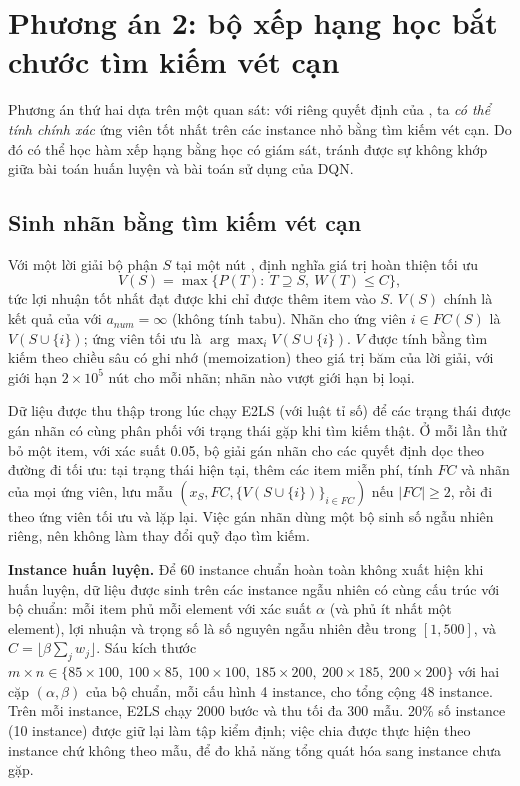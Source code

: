 \section{Phương án 2: bộ xếp hạng học bắt chước tìm kiếm vét cạn}\label{sec:ranker}

Phương án thứ hai dựa trên một quan sát: với riêng quyết định của \addstar, ta \emph{có thể tính chính xác} ứng viên tốt nhất trên các instance nhỏ bằng tìm kiếm vét cạn. Do đó có thể học hàm xếp hạng bằng học có giám sát, tránh được sự không khớp giữa bài toán huấn luyện và bài toán sử dụng của DQN.

\subsection{Sinh nhãn bằng tìm kiếm vét cạn}

Với một lời giải bộ phận $S$ tại một nút \addstar, định nghĩa giá trị hoàn thiện tối ưu
\begin{equation}
V(S)=\max\big\{P(T):\ T\supseteq S,\ W(T)\le C\big\},
\label{eq:completion}
\end{equation}
tức lợi nhuận tốt nhất đạt được khi chỉ được thêm item vào $S$. $V(S)$ chính là kết quả của \addstar với $a_{num}=\infty$ (không tính tabu). Nhãn cho ứng viên $i\in FC(S)$ là $V(S\cup\{i\})$; ứng viên tối ưu là $\arg\max_i V(S\cup\{i\})$. $V$ được tính bằng tìm kiếm theo chiều sâu có ghi nhớ (memoization) theo giá trị băm của lời giải, với giới hạn $2\times10^5$ nút cho mỗi nhãn; nhãn nào vượt giới hạn bị loại.

Dữ liệu được thu thập trong lúc chạy E2LS (với luật tỉ số) để các trạng thái được gán nhãn có cùng phân phối với trạng thái gặp khi tìm kiếm thật. Ở mỗi lần thử bỏ một item, với xác suất 0.05, bộ giải gán nhãn cho các quyết định dọc theo đường đi tối ưu: tại trạng thái hiện tại, thêm các item miễn phí, tính $FC$ và nhãn của mọi ứng viên, lưu mẫu $(x_S, FC, \{V(S\cup\{i\})\}_{i\in FC})$ nếu $|FC|\ge2$, rồi đi theo ứng viên tối ưu và lặp lại. Việc gán nhãn dùng một bộ sinh số ngẫu nhiên riêng, nên không làm thay đổi quỹ đạo tìm kiếm.

\textbf{Instance huấn luyện.} Để 60 instance chuẩn hoàn toàn không xuất hiện khi huấn luyện, dữ liệu được sinh trên các instance ngẫu nhiên có cùng cấu trúc với bộ chuẩn: mỗi item phủ mỗi element với xác suất $\alpha$ (và phủ ít nhất một element), lợi nhuận và trọng số là số nguyên ngẫu nhiên đều trong $[1,500]$, và $C=\lfloor\beta\sum_jw_j\rfloor$. Sáu kích thước $m\times n\in\{85\times100,\ 100\times85,\ 100\times100,\ 185\times200,\ 200\times185,\ 200\times200\}$ với hai cặp $(\alpha,\beta)$ của bộ chuẩn, mỗi cấu hình 4 instance, cho tổng cộng 48 instance. Trên mỗi instance, E2LS chạy 2000 bước và thu tối đa 300 mẫu. 20\% số instance (10 instance) được giữ lại làm tập kiểm định; việc chia được thực hiện theo instance chứ không theo mẫu, để đo khả năng tổng quát hóa sang instance chưa gặp.

